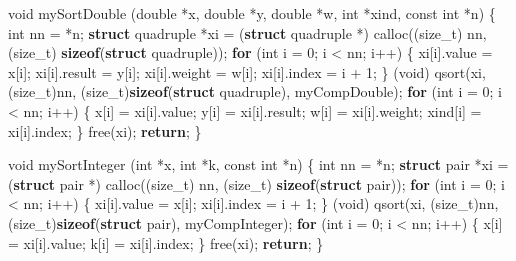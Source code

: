 \documentclass[
  12pt,
]{book}
\newenvironment{Shaded}{\begin{snugshade}}{\end{snugshade}}
\newcommand{\ControlFlowTok}[1]{\textcolor[rgb]{0.13,0.29,0.53}{\textbf{#1}}}
\newcommand{\DataTypeTok}[1]{\textcolor[rgb]{0.13,0.29,0.53}{#1}}
\newcommand{\DecValTok}[1]{\textcolor[rgb]{0.00,0.00,0.81}{#1}}
\newcommand{\KeywordTok}[1]{\textcolor[rgb]{0.13,0.29,0.53}{\textbf{#1}}}
\newcommand{\NormalTok}[1]{#1}
\theoremstyle{definition}
\theoremstyle{definition}
\theoremstyle{definition}
\theoremstyle{definition}
\theoremstyle{remark}
\begin{document}
\begin{Shaded}
\begin{Highlighting}[]
\DataTypeTok{void}\NormalTok{ mySortDouble (}\DataTypeTok{double}\NormalTok{ *x, }\DataTypeTok{double}\NormalTok{ *y, }\DataTypeTok{double}\NormalTok{ *w, }\DataTypeTok{int}\NormalTok{ *xind, }\DataTypeTok{const} \DataTypeTok{int}\NormalTok{ *n) \{}
    \DataTypeTok{int}\NormalTok{ nn = *n;}
    \KeywordTok{struct}\NormalTok{ quadruple *xi =}
\NormalTok{        (}\KeywordTok{struct}\NormalTok{ quadruple *) calloc((}\DataTypeTok{size\_t}\NormalTok{) nn, (}\DataTypeTok{size\_t}\NormalTok{) }\KeywordTok{sizeof}\NormalTok{(}\KeywordTok{struct}\NormalTok{ quadruple));}
    \ControlFlowTok{for}\NormalTok{ (}\DataTypeTok{int}\NormalTok{ i = }\DecValTok{0}\NormalTok{; i \textless{} nn; i++) \{}
\NormalTok{        xi[i].value = x[i];}
\NormalTok{        xi[i].result = y[i];}
\NormalTok{        xi[i].weight = w[i];}
\NormalTok{        xi[i].index = i + }\DecValTok{1}\NormalTok{;}
\NormalTok{    \}}
\NormalTok{    (}\DataTypeTok{void}\NormalTok{) qsort(xi, (}\DataTypeTok{size\_t}\NormalTok{)nn, (}\DataTypeTok{size\_t}\NormalTok{)}\KeywordTok{sizeof}\NormalTok{(}\KeywordTok{struct}\NormalTok{ quadruple), myCompDouble);}
    \ControlFlowTok{for}\NormalTok{ (}\DataTypeTok{int}\NormalTok{ i = }\DecValTok{0}\NormalTok{; i \textless{} nn; i++) \{}
\NormalTok{        x[i] = xi[i].value;}
\NormalTok{        y[i] = xi[i].result;}
\NormalTok{        w[i] = xi[i].weight;}
\NormalTok{        xind[i] = xi[i].index;}
\NormalTok{    \}}
\NormalTok{    free(xi);}
    \ControlFlowTok{return}\NormalTok{;}
\NormalTok{\}}

\DataTypeTok{void}\NormalTok{ mySortInteger (}\DataTypeTok{int}\NormalTok{ *x, }\DataTypeTok{int}\NormalTok{ *k, }\DataTypeTok{const} \DataTypeTok{int}\NormalTok{ *n) \{}
    \DataTypeTok{int}\NormalTok{ nn = *n;}
    \KeywordTok{struct}\NormalTok{ pair *xi =}
\NormalTok{        (}\KeywordTok{struct}\NormalTok{ pair *) calloc((}\DataTypeTok{size\_t}\NormalTok{) nn, (}\DataTypeTok{size\_t}\NormalTok{) }\KeywordTok{sizeof}\NormalTok{(}\KeywordTok{struct}\NormalTok{ pair));}
    \ControlFlowTok{for}\NormalTok{ (}\DataTypeTok{int}\NormalTok{ i = }\DecValTok{0}\NormalTok{; i \textless{} nn; i++) \{}
\NormalTok{        xi[i].value = x[i];}
\NormalTok{        xi[i].index = i + }\DecValTok{1}\NormalTok{;}
\NormalTok{    \}}
\NormalTok{    (}\DataTypeTok{void}\NormalTok{) qsort(xi, (}\DataTypeTok{size\_t}\NormalTok{)nn, (}\DataTypeTok{size\_t}\NormalTok{)}\KeywordTok{sizeof}\NormalTok{(}\KeywordTok{struct}\NormalTok{ pair), myCompInteger);}
    \ControlFlowTok{for}\NormalTok{ (}\DataTypeTok{int}\NormalTok{ i = }\DecValTok{0}\NormalTok{; i \textless{} nn; i++) \{}
\NormalTok{        x[i] = xi[i].value;}
\NormalTok{        k[i] = xi[i].index;}
\NormalTok{    \}}
\NormalTok{    free(xi);}
    \ControlFlowTok{return}\NormalTok{;}
\NormalTok{\}}


\end{Highlighting}
\end{Shaded}
\end{document}
